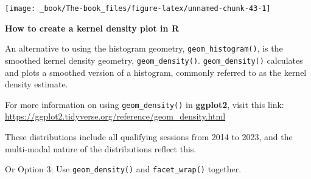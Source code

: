 \documentclass[
]{book}
\begin{document}
\begin{center}\texttt{[image: \_book/The-book\_files/figure-latex/unnamed-chunk-43-1]} \end{center}

\begin{blackbox}

\begin{center}
\textbf{How to create a kernel density plot in R}

\end{center}

An alternative to using the histogram geometry, \texttt{geom\_histogram()}, is the smoothed kernel density geometry, \texttt{geom\_density()}. \texttt{geom\_density()} calculates and plots a smoothed version of a histogram, commonly referred to as the kernel density estimate.

For more information on using \texttt{geom\_density()} in \textbf{ggplot2}, visit this link: \url{https://ggplot2.tidyverse.org/reference/geom_density.html}

\end{blackbox}

These distributions include all qualifying sessions from 2014 to 2023, and the multi-modal nature of the distributions reflect this.

Or Option 3: Use \texttt{geom\_density()} and \texttt{facet\_wrap()} together.
\end{document}
